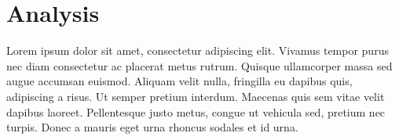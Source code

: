 \chapter{Analysis}

Lorem ipsum dolor sit amet, consectetur adipiscing elit. Vivamus tempor purus nec diam consectetur ac placerat metus rutrum. Quisque ullamcorper massa sed augue accumsan euismod. Aliquam velit nulla, fringilla eu dapibus quis, adipiscing a risus. Ut semper pretium interdum. Maecenas quis sem vitae velit dapibus laoreet. Pellentesque justo metus, congue ut vehicula sed, pretium nec turpis. Donec a mauris eget urna rhoncus sodales et id urna.








